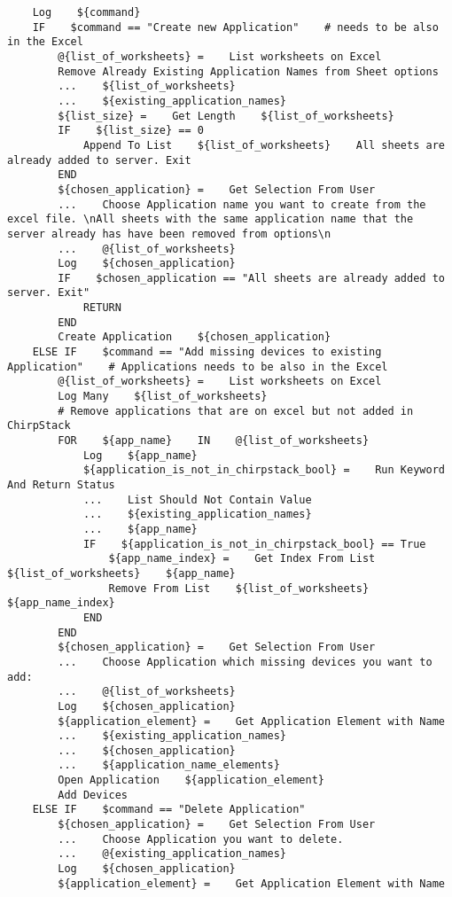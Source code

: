 \begin{verbatim}
    Log    ${command}
    IF    $command == "Create new Application"    # needs to be also in the Excel
        @{list_of_worksheets} =    List worksheets on Excel
        Remove Already Existing Application Names from Sheet options
        ...    ${list_of_worksheets}
        ...    ${existing_application_names}
        ${list_size} =    Get Length    ${list_of_worksheets}
        IF    ${list_size} == 0
            Append To List    ${list_of_worksheets}    All sheets are already added to server. Exit
        END
        ${chosen_application} =    Get Selection From User
        ...    Choose Application name you want to create from the excel file. \nAll sheets with the same application name that the server already has have been removed from options\n
        ...    @{list_of_worksheets}
        Log    ${chosen_application}
        IF    $chosen_application == "All sheets are already added to server. Exit"
            RETURN
        END
        Create Application    ${chosen_application}
    ELSE IF    $command == "Add missing devices to existing Application"    # Applications needs to be also in the Excel
        @{list_of_worksheets} =    List worksheets on Excel
        Log Many    ${list_of_worksheets}
        # Remove applications that are on excel but not added in ChirpStack
        FOR    ${app_name}    IN    @{list_of_worksheets}
            Log    ${app_name}
            ${application_is_not_in_chirpstack_bool} =    Run Keyword And Return Status
            ...    List Should Not Contain Value
            ...    ${existing_application_names}
            ...    ${app_name}
            IF    ${application_is_not_in_chirpstack_bool} == True
                ${app_name_index} =    Get Index From List    ${list_of_worksheets}    ${app_name}
                Remove From List    ${list_of_worksheets}    ${app_name_index}
            END
        END
        ${chosen_application} =    Get Selection From User
        ...    Choose Application which missing devices you want to add:
        ...    @{list_of_worksheets}
        Log    ${chosen_application}
        ${application_element} =    Get Application Element with Name
        ...    ${existing_application_names}
        ...    ${chosen_application}
        ...    ${application_name_elements}
        Open Application    ${application_element}
        Add Devices
    ELSE IF    $command == "Delete Application"
        ${chosen_application} =    Get Selection From User
        ...    Choose Application you want to delete.
        ...    @{existing_application_names}
        Log    ${chosen_application}
        ${application_element} =    Get Application Element with Name

\end{verbatim}
